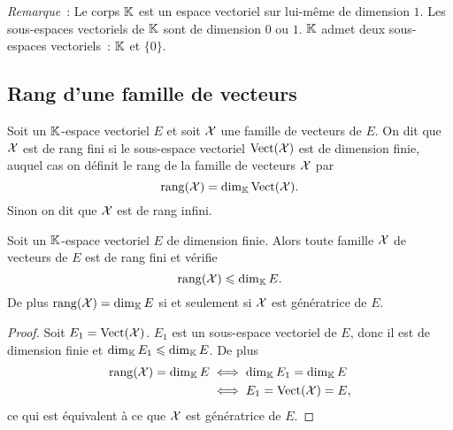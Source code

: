 \emph{Remarque}~: Le corps \(\mathbb{K}\) est un espace vectoriel sur lui-même de dimension \(1\). Les sous-espaces vectoriels de \(\mathbb{K}\) sont de dimension \(0\) ou \(1\). \(\mathbb{K}\) admet deux sous-espaces vectoriels~: \(\mathbb{K}\) et \(\{0\}\).

\subsection{Rang d'une famille de vecteurs}

\begin{defdef}
  Soit un \(\mathbb{K}\)-espace vectoriel \(E\) et soit \(\mathcal{X}\) une famille de vecteurs de \(E\). On dit que \(\mathcal{X}\) est de rang fini si le sous-espace vectoriel \(\operatorname{Vect}(\mathcal{X})\) est de dimension finie, auquel cas on définit le rang de la famille de vecteurs \(\mathcal{X}\) par
  \begin{equation}
    \operatorname{rang}(\mathcal{X})=\operatorname{dim}_{\mathbb{K}} \operatorname{Vect}(\mathcal{X}).
  \end{equation}
  Sinon on dit que \(\mathcal{X}\) est de rang infini.
\end{defdef}

\begin{prop}
  Soit un \(\mathbb{K}\)-espace vectoriel \(E\) de dimension finie. Alors toute famille \(\mathcal{X}\) de vecteurs de \(E\) est de rang fini et vérifie
  \begin{equation}
    \operatorname{rang}(\mathcal{X}) \leqslant \operatorname{dim}_{\mathbb{K}} E.
  \end{equation}
  De plus \(\operatorname{rang}(\mathcal{X}) = \operatorname{dim}_{\mathbb{K}} E\) si et seulement si \(\mathcal{X}\) est génératrice de \(E\).
\end{prop}
\begin{proof}
  Soit \(E_1=\operatorname{Vect}(\mathcal{X})\). \(E_1\) est un sous-espace vectoriel de \(E\), donc il est de dimension finie et \(\operatorname{dim}_{\mathbb{K}} E_1 \leqslant \operatorname{dim}_{\mathbb{K}} E\). De plus
  \begin{align}
    \operatorname{rang}(\mathcal{X}) = \operatorname{dim}_{\mathbb{K}} E &\iff \operatorname{dim}_{\mathbb{K}} E_1 = \operatorname{dim}_{\mathbb{K}} E\\
                        & \iff E_1=\operatorname{Vect}(\mathcal{X})=E,
  \end{align}
  ce qui est équivalent à ce que \(\mathcal{X}\) est génératrice de \(E\).
\end{proof}


